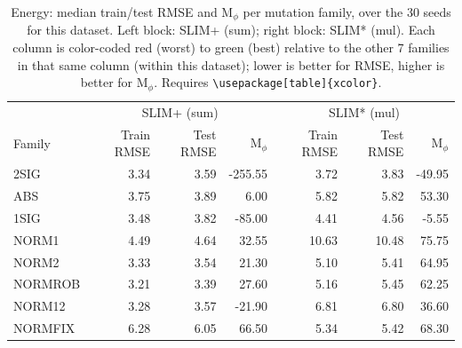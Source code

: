 \begin{table}[t]
\centering
\caption{Energy: median train/test RMSE and M$_\phi$ per mutation family, over the 30 seeds for this dataset. Left block: SLIM+ (sum); right block: SLIM* (mul). Each column is color-coded red (worst) to green (best) relative to the other 7 families in that same column (within this dataset); lower is better for RMSE, higher is better for M$_\phi$. Requires \texttt{\textbackslash usepackage[table]\{xcolor\}}.}
\label{tab:summary-median-performance-energy}
\begin{tabular}{lrrr|rrr}
\toprule
& \multicolumn{3}{c|}{SLIM+ (sum)} & \multicolumn{3}{c}{SLIM* (mul)} \\
Family & Train RMSE & Test RMSE & M$_\phi$ & Train RMSE & Test RMSE & M$_\phi$ \\
\midrule
2SIG & \cellcolor[HTML]{B5DDAF}3.34 & \cellcolor[HTML]{BBDFAF}3.59 & \cellcolor[HTML]{FAAAA5}-255.55 & \cellcolor[HTML]{AEDBB0}3.72 & \cellcolor[HTML]{AEDBB0}3.83 & \cellcolor[HTML]{FAAAA5}-49.95 \\
ABS & \cellcolor[HTML]{CBE4AD}3.75 & \cellcolor[HTML]{CDE5AD}3.89 & \cellcolor[HTML]{CDE5AD}6.00 & \cellcolor[HTML]{E0EBAA}5.82 & \cellcolor[HTML]{DFEBAB}5.82 & \cellcolor[HTML]{CBE5AD}53.30 \\
1SIG & \cellcolor[HTML]{BDE0AF}3.48 & \cellcolor[HTML]{C9E4AD}3.82 & \cellcolor[HTML]{FAF4A7}-85.00 & \cellcolor[HTML]{BFE0AE}4.41 & \cellcolor[HTML]{C0E1AE}4.56 & \cellcolor[HTML]{FEE0A6}-5.55 \\
NORM1 & \cellcolor[HTML]{F2F2A8}4.49 & \cellcolor[HTML]{FAF4A7}4.64 & \cellcolor[HTML]{BFE1AE}32.55 & \cellcolor[HTML]{FAAAA5}10.63 & \cellcolor[HTML]{FAAAA5}10.48 & \cellcolor[HTML]{AEDBB0}75.75 \\
NORM2 & \cellcolor[HTML]{B5DDB0}3.33 & \cellcolor[HTML]{B8DEAF}3.54 & \cellcolor[HTML]{C5E3AE}21.30 & \cellcolor[HTML]{CFE6AC}5.10 & \cellcolor[HTML]{D5E8AC}5.41 & \cellcolor[HTML]{BCE0AF}64.95 \\
NORMROB & \cellcolor[HTML]{AEDBB0}3.21 & \cellcolor[HTML]{AEDBB0}3.39 & \cellcolor[HTML]{C2E2AE}27.60 & \cellcolor[HTML]{D0E6AC}5.16 & \cellcolor[HTML]{D6E8AC}5.45 & \cellcolor[HTML]{C0E1AE}62.25 \\
NORM12 & \cellcolor[HTML]{B2DCB0}3.28 & \cellcolor[HTML]{B9DFAF}3.57 & \cellcolor[HTML]{DBEAAB}-21.90 & \cellcolor[HTML]{F6F3A8}6.81 & \cellcolor[HTML]{F6F3A8}6.80 & \cellcolor[HTML]{E1ECAA}36.60 \\
NORMFIX & \cellcolor[HTML]{FAAAA5}6.28 & \cellcolor[HTML]{FAAAA5}6.05 & \cellcolor[HTML]{AEDBB0}66.50 & \cellcolor[HTML]{D4E8AC}5.34 & \cellcolor[HTML]{D5E8AC}5.42 & \cellcolor[HTML]{B8DEAF}68.30 \\
\bottomrule
\end{tabular}
\end{table}

